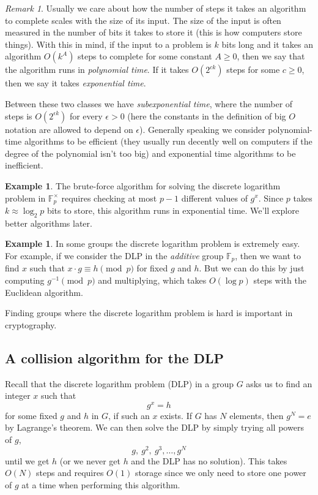 \documentclass[12pt]{article}
\theoremstyle{plain}
\theoremstyle{definition}
\newtheorem{example}[theorem]{Example}
\theoremstyle{remark}
\newtheorem{remark}[theorem]{Remark}
\newcommand{\F}{\mathbb{F}}
\begin{document}
\begin{remark}
    Usually we care about how the number of steps it takes an algorithm to complete scales with the size of its input.
    The size of the input is often measured in the number of bits it takes to store it (this is how computers store things).
    With this in mind, if the input to a problem is $k$ bits long and it takes an algorithm $O(k^A)$ steps to complete for some constant $A \geq 0$, then we say that the algorithm runs in \emph{polynomial time}.
    If it takes $O(2^{ck})$ steps for some $c \geq 0$, then we say it takes \emph{exponential time}.

    Between these two classes we have \emph{subexponential time}, where the number of steps is $O(2^{\epsilon k})$ for every $\epsilon > 0$ (here the constants in the definition of big $O$ notation are allowed to depend on $\epsilon$).
    Generally speaking we consider polynomial-time algorithms to be efficient (they usually run decently well on computers if the degree of the polynomial isn't too big) and exponential time algorithms to be inefficient.
\end{remark}


\begin{example}
    The brute-force algorithm for solving the discrete logarithm problem in $\F_p^\times$ requires checking at most $p-1$ different values of $g^x$.
    Since $p$ takes $k \approx \log_2 p$ bits to store, this algorithm runs in exponential time.
    We'll explore better algorithms later.
\end{example}

\begin{example}
    In some groups the discrete logarithm problem is extremely easy.
    For example, if we consider the DLP in the \emph{additive} group $\F_p$, then we want to find $x$ such that $x\cdot g \equiv h\pmod p$ for fixed $g$ and $h$.
    But we can do this by just computing $g^{-1}\pmod p$ and multiplying, which takes $O(\log p)$ steps with the Euclidean algorithm.

    Finding groups where the discrete logarithm problem is hard is important in cryptography.
\end{example}










\subsection{A collision algorithm for the DLP}
Recall that the discrete logarithm problem (DLP) in a group $G$ asks us to find an integer $x$ such that
\[
    g^x = h
\]
for some fixed $g$ and $h$ in $G$, if such an $x$ exists.
If $G$ has $N$ elements, then $g^N = e$ by Lagrange's theorem.
We can then solve the DLP by simply trying all powers of $g$,
\[
    g,\ g^2,\ g^3,\ldots, g^N
\]
until we get $h$ (or we never get $h$ and the DLP has no solution).
This takes $O(N)$ steps and requires $O(1)$ storage since we only need to store one power of $g$ at a time when performing this algorithm.
\end{document}
